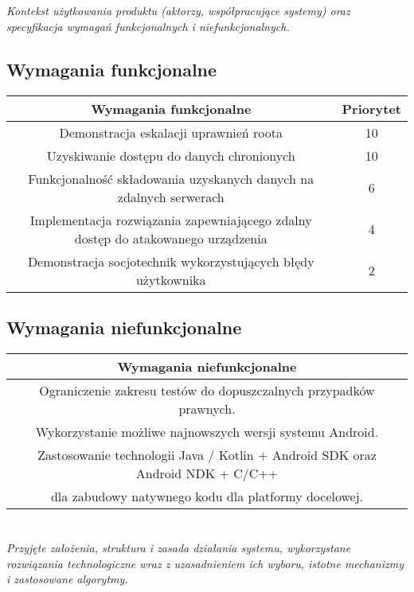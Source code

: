 \documentclass[polish,12pt]{aghthesis}
\begin{document}
\section{\SectionTitleScope}
\label{sec:zakres-funkcjonalnosci}
\emph{Kontekst użytkowania produktu (aktorzy, współpracujące systemy)
  oraz specyfikacja wymagań funkcjonalnych i niefunkcjonalnych.}  %
\subsection{Wymagania funkcjonalne}
\begin{tabular}{|c|c|}
    \hline
    \textbf{Wymagania funkcjonalne} & \textbf{Priorytet} \\ 
    \hline
    Demonstracja eskalacji uprawnień roota & 10 \\
    \hline
    Uzyskiwanie dostępu do danych chronionych &	10 \\
    \hline
    Funkcjonalność składowania uzyskanych danych na zdalnych serwerach & 6 \\
    \hline
    Implementacja rozwiązania zapewniającego zdalny dostęp do atakowanego urządzenia & 4 \\
    \hline
    Demonstracja socjotechnik wykorzystujących błędy użytkownika & 2 \\
    \hline
\end{tabular}
\subsection{Wymagania niefunkcjonalne}
\begin{tabular}{|c|}
    \hline
    \textbf{Wymagania niefunkcjonalne} \\ 
    \hline
    Ograniczenie zakresu testów do dopuszczalnych przypadków prawnych. \\
    \hline
    Wykorzystanie możliwe najnowszych wersji systemu Android. \\
    \hline
    Zastosowanie technologii Java / Kotlin + Android SDK oraz Android NDK + C/C++\\dla zabudowy natywnego kodu dla
    platformy docelowej. \\
    \hline
\end{tabular} 


\section{\SectionTitleRealizationAspects}
\label{sec:wybrane-aspekty-realizacji}
\emph{Przyjęte założenia, struktura i zasada działania systemu,
  wykorzystane rozwiązania technologiczne wraz z uzasadnieniem
  ich wyboru, istotne mechanizmy i zastosowane algorytmy.} %
\end{document}
